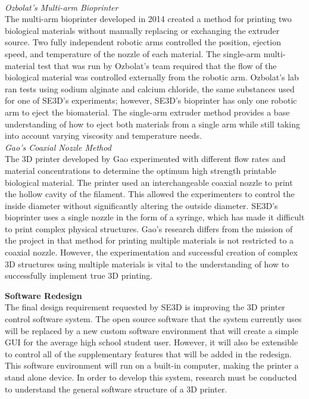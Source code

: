 \\
\begin{adjustwidth}{2.5em}{0pt}

\textit{Ozbolat’s Multi-arm Bioprinter}
\\
The multi-arm bioprinter developed in 2014 created a method for printing two biological materials without manually replacing or exchanging the extruder source. Two fully independent robotic arms controlled the position, ejection speed, and temperature of the nozzle of each material. The single-arm multi-material test that was run by Ozbolat’s team required that the flow of the biological material was controlled externally from the robotic arm. Ozbolat’s lab ran tests using sodium alginate and calcium chloride, the same substances used for one of SE3D’s experiments; however, SE3D’s bioprinter has only one robotic arm to eject the biomaterial. The single-arm extruder method provides a base understanding of how to eject both materials from a single arm while still taking into account varying viscosity and temperature needs. 
\\
\textit{Gao’s Coaxial Nozzle Method}
\\
The 3D printer developed by Gao experimented with different flow rates and material concentrations to determine the optimum high strength printable biological material. The printer used an interchangeable coaxial nozzle to print the hollow cavity of the filament. This allowed the experimenters to control the inside diameter without significantly altering the outside diameter. SE3D’s bioprinter uses a single nozzle in the form of a syringe, which has made it difficult to print complex physical structures. Gao’s research differs from the mission of the project in that method for printing multiple materials is not restricted to a coaxial nozzle. However, the experimentation and successful creation of complex 3D structures using multiple materials is vital to the understanding of how to successfully implement true 3D printing. 
\\
\end{adjustwidth}
\textbf{Software Redesign}
\\
The final design requirement requested by SE3D is improving the 3D printer control software system. The open source software that the system currently uses will be replaced by a new custom software environment that will create a simple GUI for the average high school student user. However, it will also be extensible to control all of the supplementary features that will be added in the redesign. This software environment will run on a built-in computer, making the printer a stand alone device. In order to develop this system, research must be conducted to understand the general software structure of a 3D printer.
